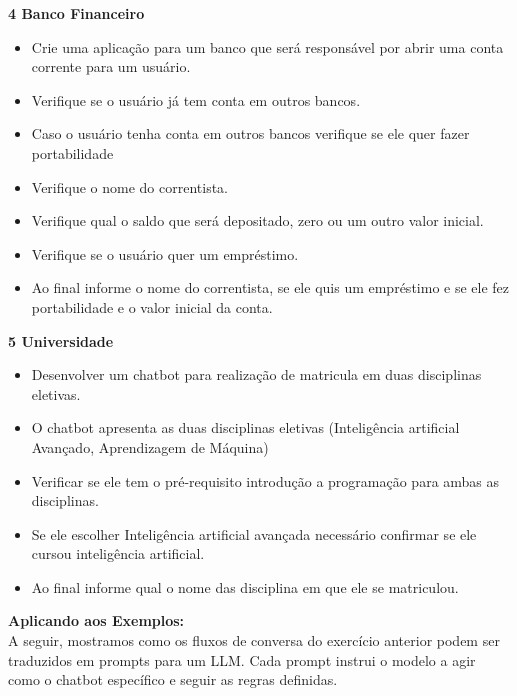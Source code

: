 \documentclass[14pt,a4paper,oneside]{book}
\begin{document}
\vspace{\baselineskip}

\textbf{4 Banco Financeiro} \\

\begin{itemize}[nosep]
	\item Crie uma aplicação para um banco que será responsável por abrir uma conta corrente para um usuário.
	\item Verifique se o usuário já tem conta em outros bancos.
	\item Caso o usuário tenha conta em outros bancos verifique se ele quer fazer portabilidade
	\item Verifique o nome do correntista.
	\item Verifique qual o saldo que será depositado, zero ou um outro valor inicial.
	\item Verifique se o usuário quer um empréstimo.
	\item Ao final informe o nome do correntista, se ele quis um empréstimo e se ele fez portabilidade e o valor inicial da conta.
\end{itemize} 

\vspace{\baselineskip}

\textbf{5 Universidade} \\

\begin{itemize}[nosep]
	\item Desenvolver um chatbot para realização de matricula em duas disciplinas eletivas.
	\item O chatbot apresenta as duas disciplinas eletivas (Inteligência artificial Avançado, Aprendizagem de Máquina)
	\item Verificar se ele tem o pré-requisito introdução a programação para ambas as disciplinas.
	\item Se ele escolher Inteligência artificial avançada necessário confirmar se ele cursou inteligência artificial.
	\item Ao final informe qual o nome das disciplina em que ele se matriculou.
\end{itemize} 

\vspace{\baselineskip}

\textbf{Aplicando aos Exemplos:} \\

A seguir, mostramos como os fluxos de conversa do exercício anterior podem ser traduzidos em prompts para um LLM. Cada prompt instrui o modelo a agir como o chatbot específico e seguir as regras definidas.
\end{document}
